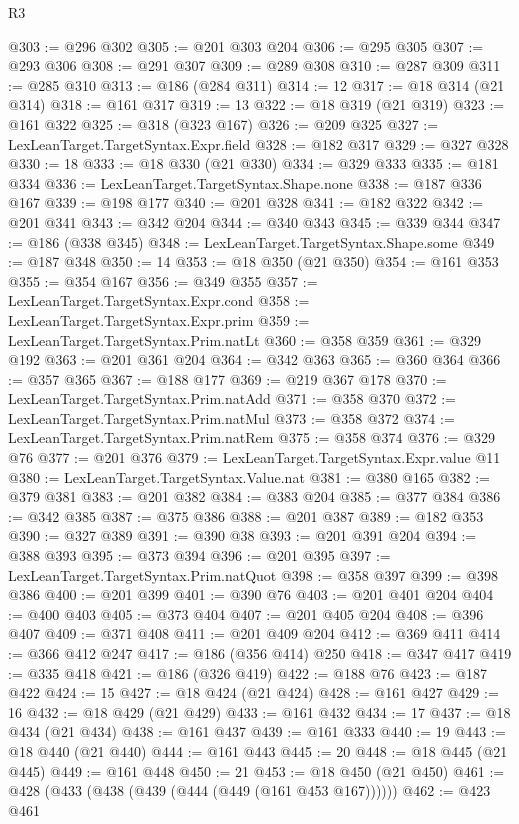 \begin{lexlean}{R3}
\begin{coremodule}
@303 := @296 @302
@305 := @201 @303 @204
@306 := @295 @305
@307 := @293 @306
@308 := @291 @307
@309 := @289 @308
@310 := @287 @309
@311 := @285 @310
@313 := @186 (@284 @311)
@314 := 12
@317 := @18 @314 (@21 @314)
@318 := @161 @317
@319 := 13
@322 := @18 @319 (@21 @319)
@323 := @161 @322
@325 := @318 (@323 @167)
@326 := @209 @325
@327 := LexLeanTarget.TargetSyntax.Expr.field
@328 := @182 @317
@329 := @327 @328
@330 := 18
@333 := @18 @330 (@21 @330)
@334 := @329 @333
@335 := @181 @334
@336 := LexLeanTarget.TargetSyntax.Shape.none
@338 := @187 @336 @167
@339 := @198 @177
@340 := @201 @328
@341 := @182 @322
@342 := @201 @341
@343 := @342 @204
@344 := @340 @343
@345 := @339 @344
@347 := @186 (@338 @345)
@348 := LexLeanTarget.TargetSyntax.Shape.some
@349 := @187 @348
@350 := 14
@353 := @18 @350 (@21 @350)
@354 := @161 @353
@355 := @354 @167
@356 := @349 @355
@357 := LexLeanTarget.TargetSyntax.Expr.cond
@358 := LexLeanTarget.TargetSyntax.Expr.prim
@359 := LexLeanTarget.TargetSyntax.Prim.natLt
@360 := @358 @359
@361 := @329 @192
@363 := @201 @361 @204
@364 := @342 @363
@365 := @360 @364
@366 := @357 @365
@367 := @188 @177
@369 := @219 @367 @178
@370 := LexLeanTarget.TargetSyntax.Prim.natAdd
@371 := @358 @370
@372 := LexLeanTarget.TargetSyntax.Prim.natMul
@373 := @358 @372
@374 := LexLeanTarget.TargetSyntax.Prim.natRem
@375 := @358 @374
@376 := @329 @76
@377 := @201 @376
@379 := LexLeanTarget.TargetSyntax.Expr.value @11
@380 := LexLeanTarget.TargetSyntax.Value.nat
@381 := @380 @165
@382 := @379 @381
@383 := @201 @382
@384 := @383 @204
@385 := @377 @384
@386 := @342 @385
@387 := @375 @386
@388 := @201 @387
@389 := @182 @353
@390 := @327 @389
@391 := @390 @38
@393 := @201 @391 @204
@394 := @388 @393
@395 := @373 @394
@396 := @201 @395
@397 := LexLeanTarget.TargetSyntax.Prim.natQuot
@398 := @358 @397
@399 := @398 @386
@400 := @201 @399
@401 := @390 @76
@403 := @201 @401 @204
@404 := @400 @403
@405 := @373 @404
@407 := @201 @405 @204
@408 := @396 @407
@409 := @371 @408
@411 := @201 @409 @204
@412 := @369 @411
@414 := @366 @412 @247
@417 := @186 (@356 @414) @250
@418 := @347 @417
@419 := @335 @418
@421 := @186 (@326 @419)
@422 := @188 @76
@423 := @187 @422
@424 := 15
@427 := @18 @424 (@21 @424)
@428 := @161 @427
@429 := 16
@432 := @18 @429 (@21 @429)
@433 := @161 @432
@434 := 17
@437 := @18 @434 (@21 @434)
@438 := @161 @437
@439 := @161 @333
@440 := 19
@443 := @18 @440 (@21 @440)
@444 := @161 @443
@445 := 20
@448 := @18 @445 (@21 @445)
@449 := @161 @448
@450 := 21
@453 := @18 @450 (@21 @450)
@461 := @428 (@433 (@438 (@439 (@444 (@449 (@161 @453 @167))))))
@462 := @423 @461

\end{coremodule}
\end{lexlean}
